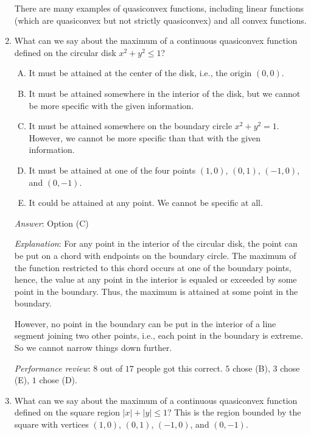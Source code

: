 \documentclass[10pt]{amsart}
\begin{document}
\begin{enumerate}
  There are many examples of quasiconvex functions, including linear
  functions (which are quasiconvex but not strictly quasiconvex)
  and all convex functions.


\item What can we say about the maximum of a continuous quasiconvex
  function defined on the circular disk $x^2 + y^2 \le 1$?

  \begin{enumerate}[(A)]
  \item It must be attained at the center of the disk, i.e., the
    origin $(0,0)$.
  \item It must be attained somewhere in the interior of the disk, but
    we cannot be more specific with the given information.
  \item It must be attained somewhere on the boundary circle $x^2 +
    y^2 = 1$. However, we cannot be more specific than that with the
    given information.
  \item It must be attained at one of the four points $(1,0)$,
    $(0,1)$, $(-1,0)$, and $(0,-1)$. 
  \item It could be attained at any point. We cannot be specific at all.
  \end{enumerate}

  {\em Answer}: Option (C)

  {\em Explanation}: For any point in the interior of the circular
  disk, the point can be put on a chord with endpoints on the boundary
  circle. The maximum of the function restricted to this chord occurs
  at one of the boundary points, hence, the value at any point in the
  interior is equaled or exceeded by some point in the boundary. Thus,
  the maximum is attained at some point in the boundary.

  However, no point in the boundary can be put in the interior of a
  line segment joining two other points, i.e., each point in the
  boundary is extreme. So we cannot narrow things down further.

  {\em Performance review}: $8$ out of $17$ people got this
  correct. $5$ chose (B), $3$ chose (E), $1$ chose (D).

\item What can we say about the maximum of a continuous quasiconvex
  function defined on the square region $|x| + |y|\le 1$? This is the
  region bounded by the square with vertices $(1,0)$, $(0,1)$,
  $(-1,0)$, and $(0,-1)$.


\end{enumerate}
\end{document}
